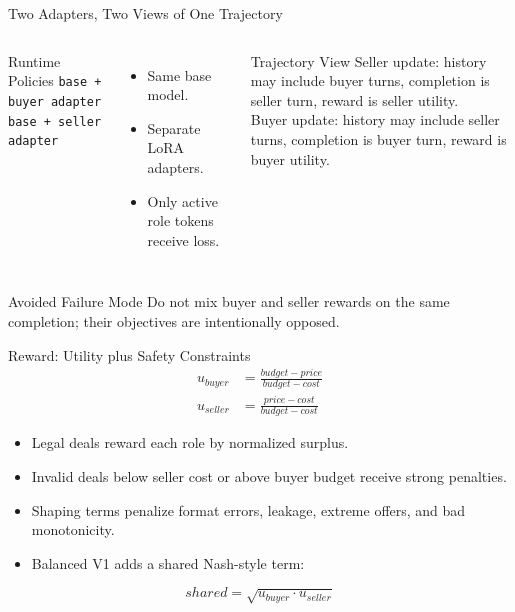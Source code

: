 \documentclass{beamer}
\begin{document}
\begin{frame}{Two Adapters, Two Views of One Trajectory}
\begin{columns}
\begin{block}{Runtime Policies}
\small
\texttt{base + buyer adapter}\\
\texttt{base + seller adapter}
\end{block}
\begin{itemize}
    \item Same base model.
    \item Separate LoRA adapters.
    \item Only active role tokens receive loss.
\end{itemize}
\begin{block}{Trajectory View}
\small
Seller update: history may include buyer turns, completion is seller turn,
reward is seller utility.\\[0.12cm]
Buyer update: history may include seller turns, completion is buyer turn,
reward is buyer utility.
\end{block}
\end{columns}
\vspace{0.2cm}
\begin{alertblock}{Avoided Failure Mode}
Do not mix buyer and seller rewards on the same completion; their objectives
are intentionally opposed.
\end{alertblock}
\end{frame}

\begin{frame}{Reward: Utility plus Safety Constraints}
\begin{align*}
u_{buyer} &= \frac{budget - price}{budget - cost}\\
u_{seller} &= \frac{price - cost}{budget - cost}
\end{align*}
\begin{itemize}
    \item Legal deals reward each role by normalized surplus.
    \item Invalid deals below seller cost or above buyer budget receive strong penalties.
    \item Shaping terms penalize format errors, leakage, extreme offers, and bad monotonicity.
    \item Balanced V1 adds a shared Nash-style term:
\end{itemize}
\[
shared = \sqrt{u_{buyer} \cdot u_{seller}}
\]
\end{frame}
\end{document}
